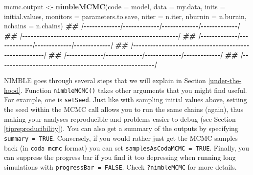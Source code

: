 \documentclass[
  12pt,
]{krantz}
\newenvironment{Shaded}{\begin{snugshade}}{\end{snugshade}}
\newcommand{\AttributeTok}[1]{\textcolor[rgb]{0.13,0.29,0.53}{#1}}
\newcommand{\DocumentationTok}[1]{\textcolor[rgb]{0.56,0.35,0.01}{\textbf{\textit{#1}}}}
\newcommand{\FunctionTok}[1]{\textcolor[rgb]{0.13,0.29,0.53}{\textbf{#1}}}
\newcommand{\NormalTok}[1]{#1}
\newcommand{\OtherTok}[1]{\textcolor[rgb]{0.56,0.35,0.01}{#1}}
\begin{document}
\begin{Shaded}
\begin{Highlighting}[]
\NormalTok{mcmc.output }\OtherTok{\textless{}{-}} \FunctionTok{nimbleMCMC}\NormalTok{(}\AttributeTok{code =}\NormalTok{ model,}
                          \AttributeTok{data =}\NormalTok{ my.data,}
                          \AttributeTok{inits =}\NormalTok{ initial.values,}
                          \AttributeTok{monitors =}\NormalTok{ parameters.to.save,}
                          \AttributeTok{niter =}\NormalTok{ n.iter,}
                          \AttributeTok{nburnin =}\NormalTok{ n.burnin,}
                          \AttributeTok{nchains =}\NormalTok{ n.chains)}
\DocumentationTok{\#\# |{-}{-}{-}{-}{-}{-}{-}{-}{-}{-}{-}{-}{-}|{-}{-}{-}{-}{-}{-}{-}{-}{-}{-}{-}{-}{-}|{-}{-}{-}{-}{-}{-}{-}{-}{-}{-}{-}{-}{-}|{-}{-}{-}{-}{-}{-}{-}{-}{-}{-}{-}{-}{-}|}
\DocumentationTok{\#\# |{-}{-}{-}{-}{-}{-}{-}{-}{-}{-}{-}{-}{-}{-}{-}{-}{-}{-}{-}{-}{-}{-}{-}{-}{-}{-}{-}{-}{-}{-}{-}{-}{-}{-}{-}{-}{-}{-}{-}{-}{-}{-}{-}{-}{-}{-}{-}{-}{-}{-}{-}{-}{-}{-}{-}|}
\DocumentationTok{\#\# |{-}{-}{-}{-}{-}{-}{-}{-}{-}{-}{-}{-}{-}|{-}{-}{-}{-}{-}{-}{-}{-}{-}{-}{-}{-}{-}|{-}{-}{-}{-}{-}{-}{-}{-}{-}{-}{-}{-}{-}|{-}{-}{-}{-}{-}{-}{-}{-}{-}{-}{-}{-}{-}|}
\DocumentationTok{\#\# |{-}{-}{-}{-}{-}{-}{-}{-}{-}{-}{-}{-}{-}{-}{-}{-}{-}{-}{-}{-}{-}{-}{-}{-}{-}{-}{-}{-}{-}{-}{-}{-}{-}{-}{-}{-}{-}{-}{-}{-}{-}{-}{-}{-}{-}{-}{-}{-}{-}{-}{-}{-}{-}{-}{-}|}
\DocumentationTok{\#\# |{-}{-}{-}{-}{-}{-}{-}{-}{-}{-}{-}{-}{-}|{-}{-}{-}{-}{-}{-}{-}{-}{-}{-}{-}{-}{-}|{-}{-}{-}{-}{-}{-}{-}{-}{-}{-}{-}{-}{-}|{-}{-}{-}{-}{-}{-}{-}{-}{-}{-}{-}{-}{-}|}
\DocumentationTok{\#\# |{-}{-}{-}{-}{-}{-}{-}{-}{-}{-}{-}{-}{-}{-}{-}{-}{-}{-}{-}{-}{-}{-}{-}{-}{-}{-}{-}{-}{-}{-}{-}{-}{-}{-}{-}{-}{-}{-}{-}{-}{-}{-}{-}{-}{-}{-}{-}{-}{-}{-}{-}{-}{-}{-}{-}|}
\end{Highlighting}
\end{Shaded}

NIMBLE goes through several steps that we will explain in Section \ref{under-the-hood}. Function \texttt{nimbleMCMC()} takes other arguments that you might find useful. For example, one is \texttt{setSeed}. Just like with sampling initial values above, setting the seed within the MCMC call allows you to run the same chains (again), thus making your analyses reproducible and problems easier to debug (see Section \ref{tipreproducibility}). You can also get a summary of the outputs by specifying \texttt{summary\ =\ TRUE}. Conversely, if you would rather just get the MCMC samples back (in \texttt{coda\ mcmc} format) you can set \texttt{samplesAsCodaMCMC\ =\ TRUE}. Finally, you can suppress the progress bar if you find it too depressing when running long simulations with \texttt{progressBar\ =\ FALSE}. Check \texttt{?nimbleMCMC} for more details.
\end{document}
